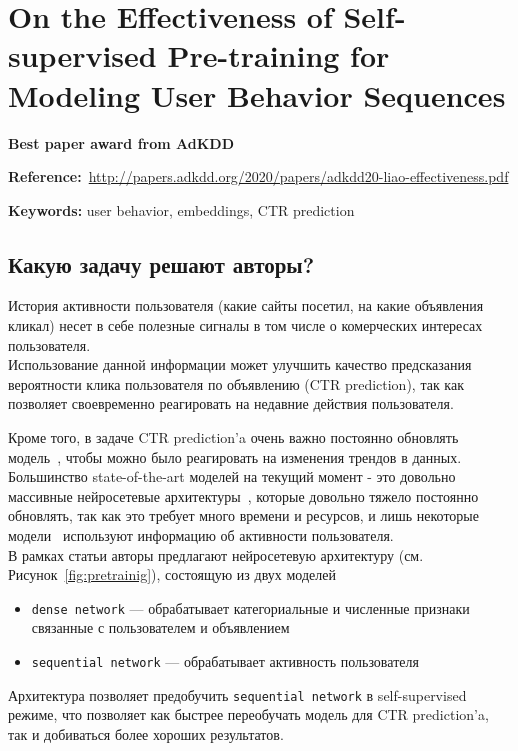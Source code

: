 \chapter{On the Effectiveness of Self-supervised Pre-training for Modeling User Behavior Sequences}

\textbf{Best paper award from AdKDD}

\textbf{Reference:}~\url{http://papers.adkdd.org/2020/papers/adkdd20-liao-effectiveness.pdf}

\textbf{Keywords:} user behavior, embeddings, CTR prediction

\section{Какую задачу решают авторы?}

История активности пользователя (какие сайты посетил, на какие объявления кликал) несет в себе полезные сигналы в том числе о комерческих интересах пользователя. \\

Использование данной информации может улучшить качество предсказания вероятности клика пользователя по объявлению (CTR prediction), так как позволяет своевременно реагировать на недавние действия пользователя.

Кроме того, в задаче CTR prediction'a очень важно постоянно обновлять модель~\cite{he2014practical}, чтобы можно было реагировать на изменения трендов в данных. \\

Большинство state-of-the-art моделей на текущий момент - это довольно массивные нейросетевые архитектуры~\cite{guo2017deepfm,zhou2018deep,wang2017deep}, которые довольно тяжело постоянно обновлять, так как это требует много времени и ресурсов, и лишь некоторые модели~\cite{zhou2018deep} используют информацию об активности пользователя. \\

В рамках статьи авторы предлагают нейросетевую архитектуру (см. Рисунок~\ref{fig:pretrainig}), состоящую из двух моделей 
\begin{itemize}
    \item \texttt{dense network} --- обрабатывает категориальные и численные признаки связанные с пользователем и объявлением
    \item \texttt{sequential network} --- обрабатывает активность пользователя
\end{itemize}

Архитектура позволяет предобучить \texttt{sequential network} в self-supervised режиме, что позволяет как быстрее переобучать модель для CTR prediction'a, так и добиваться более хороших результатов.

